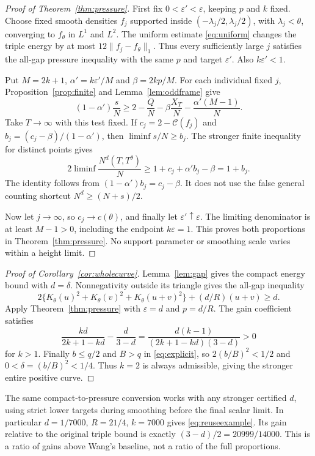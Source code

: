 \documentclass[11pt]{article}
\theoremstyle{remark}
\newcommand{\cC}{\mathcal C}
\begin{document}
\begin{proof}[Proof of Theorem~\ref{thm:pressure}]
First fix $0<\varepsilon'<\varepsilon$, keeping $p$ and $k$ fixed.
Choose fixed smooth densities $f_j$ supported inside
$(-\lambda_j/2,\lambda_j/2)$, with $\lambda_j<\theta$, converging to
$f_\theta$ in $L^1$ and $L^2$. The uniform estimate
\eqref{eq:uniform} changes the triple energy by at most
$12\|f_j-f_\theta\|_1$. Thus every sufficiently large $j$ satisfies
the all-gap pressure inequality with the same $p$ and target
$\varepsilon'$. Also $k\varepsilon'<1$.

Put $M=2k+1$, $\alpha'=k\varepsilon'/M$ and $\beta=2kp/M$.
For each individual fixed $j$, Proposition~\ref{prop:finite} and
Lemma~\ref{lem:oddframe} give
\[
 (1-\alpha')\frac{s}{N}\ge2-\frac QN
 -\beta\frac{X_T}{N}-\frac{\alpha'(M-1)}{N}.
\]
Take $T\to\infty$ with this test fixed. If $c_j=2-\cC(f_j)$ and
$b_j=(c_j-\beta)/(1-\alpha')$, then $\liminf s/N\ge b_j$.
The stronger finite inequality for distinct points gives
\[
 2\liminf\frac{N^d(T,T^\theta)}{N}
 \ge1+c_j+\alpha'b_j-\beta=1+b_j.
\]
The identity follows from $(1-\alpha')b_j=c_j-\beta$. It does not
use the false general counting shortcut $N^d\ge(N+s)/2$.

Now let $j\to\infty$, so $c_j\to c(\theta)$, and finally let
$\varepsilon'\uparrow\varepsilon$. The limiting denominator is at
least $M-1>0$, including the endpoint $k\varepsilon=1$.
This proves both proportions in Theorem~\ref{thm:pressure}.
No support parameter or smoothing scale varies within a height limit.
\end{proof}

\begin{proof}[Proof of Corollary~\ref{cor:wholecurve}]
Lemma~\ref{lem:gap} gives the compact energy bound with $d=\delta$.
Nonnegativity outside its triangle gives the all-gap inequality
\[
 2\{K_\theta(u)^2+K_\theta(v)^2+K_\theta(u+v)^2\}
 +(d/R)(u+v)\ge d.
\]
Apply Theorem~\ref{thm:pressure} with $\varepsilon=d$ and $p=d/R$.
The gain coefficient satisfies
\[
 \frac{kd}{2k+1-kd}-\frac d{3-d}
 =\frac{d(k-1)}{(2k+1-kd)(3-d)}>0
\]
for $k>1$. Finally $b\le q/2$ and $B>q$ in \eqref{eq:explicit}, so
$2(b/B)^2<1/2$ and $0<\delta=(b/B)^2<1/4$. Thus $k=2$ is always
admissible, giving the stronger entire positive curve.
\end{proof}

The same compact-to-pressure conversion works with any stronger certified
$d$, using strict lower targets during smoothing before the final scalar
limit. In particular $d=1/7000$, $R=21/4$, $k=7000$ gives
\eqref{eq:reuseexample}. Its gain relative to the original triple bound
is exactly $(3-d)/2=20999/14000$. This is a ratio of gains above Wang's
baseline, not a ratio of the full proportions.
\end{document}
